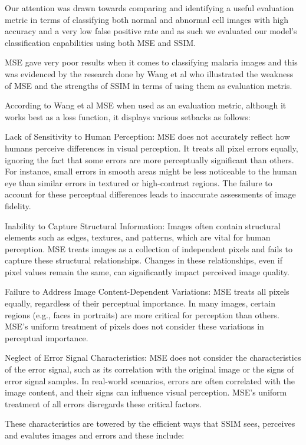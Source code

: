 \documentclass[journal,11pt,onecolumn,draftcls]{IEEEtran}
\begin{document}
Our attention was drawn towards comparing and identifying a useful evaluation metric in terms of classifying both normal and abnormal cell images with high accuracy and a very low false positive rate and as such we evaluated our model's classification capabilities using both MSE and SSIM.

MSE gave very poor results when it comes to classifying malaria images and this was evidenced by the research done by Wang et al \cite{wang2009} who illustrated the weakness of MSE and the strengths of SSIM in terms of using them as evaluation metris.

According to Wang et al \cite{wang2009} MSE when used as an evaluation metric, although it works best as a loss function, it displays various setbacks as follows:

Lack of Sensitivity to Human Perception: MSE does not accurately reflect how humans perceive differences in visual perception. It treats all pixel errors equally, ignoring the fact that some errors are more perceptually significant than others. For instance, small errors in smooth areas might be less noticeable to the human eye than similar errors in textured or high-contrast regions. The failure to account for these perceptual differences leads to inaccurate assessments of image fidelity.

Inability to Capture Structural Information: Images often contain structural elements such as edges, textures, and patterns, which are vital for human perception. MSE treats images as a collection of independent pixels and fails to capture these structural relationships. Changes in these relationships, even if pixel values remain the same, can significantly impact perceived image quality.

Failure to Address Image Content-Dependent Variations: MSE treats all pixels equally, regardless of their perceptual importance. In many images, certain regions (e.g., faces in portraits) are more critical for perception than others. MSE's uniform treatment of pixels does not consider these variations in perceptual importance.

Neglect of Error Signal Characteristics: MSE does not consider the characteristics of the error signal, such as its correlation with the original image or the signs of error signal samples. In real-world scenarios, errors are often correlated with the image content, and their signs can influence visual perception. MSE's uniform treatment of all errors disregards these critical factors.

These characteristics are towered by the efficient ways that SSIM sees, perceives and evalutes images and errors and these include:
\end{document}
